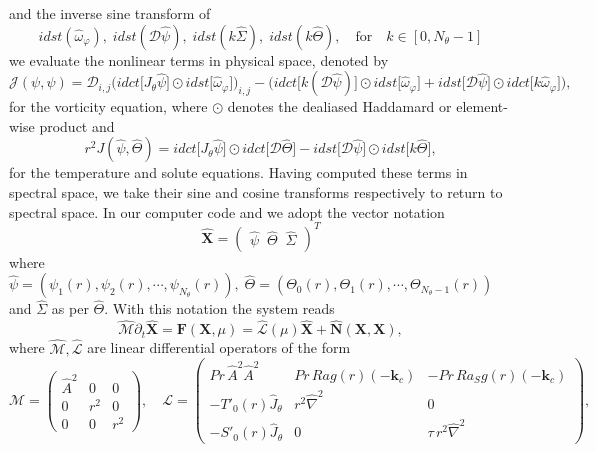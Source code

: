 \documentclass[a4paper]{article}
\begin{document}
\noindent and the inverse sine transform of
\begin{equation}
idst(\hat{\omega}_{\varphi}), \; idst(\mathcal{D} \hat{\psi}), \; idst(k \hat{\Sigma}), \; idst(k \hat{\Theta}), \quad \text{for} \quad k \in [0,N_{\theta}-1]
\end{equation}
 we evaluate the nonlinear terms in physical space, denoted by 
\begin{equation}
\mathcal{J}(\psi,\psi)  = \mathcal{D}_{i,j} \bigg( idct \big[   J_{\theta} \hat{\psi} \big] \odot idst\big[ \hat{\omega}_{\varphi} \big] \bigg)_{i,j}  - \bigg( idct\big[ k (\mathcal{D} \hat{\psi} ) \big] \odot idst\big[  \hat{\omega}_{\varphi} \big]  + idst\big[ \mathcal{D} \hat{\psi} \big] \odot idct\big[ k \hat{\omega}_{\varphi} \big] \bigg),
\label{eq:VORT_NL_SPEC}
\end{equation} 		
for the vorticity equation, where $\odot$ denotes the dealiased Haddamard or element-wise product and
\begin{equation}
r^2 J(\hat{\psi},\hat{\Theta})  = idct\big[ J_{\theta} \hat{\psi} \big] \odot idct\big[ \mathcal{D} \hat{\Theta} \big] - idst\big[ \mathcal{D} \hat{\psi} \big] \odot idst\big[ k \hat{\Theta} \big],
\label{eq:TEMP_NL_SPEC}
\end{equation}
\noindent for the temperature and solute equations. Having computed these terms in spectral space, we take their sine and cosine transforms respectively to return to spectral space. In our computer code and we adopt the vector notation
\begin{equation} 
\boldsymbol{\hat{X}} = \begin{pmatrix} \hat{\psi} \; \; \hat{\Theta} \; \; \hat{\Sigma} \end{pmatrix}^T 
\end{equation}
where $\hat{\psi} = \left( \psi_1(r), \psi_2(r), \cdots, \psi_{N_{\theta}}(r) \right), \; \hat{\Theta} = \left( \Theta_0(r), \Theta_1(r), \cdots, \Theta_{N_{\theta}-1}(r) \right)$ and $\hat{\Sigma}$ as per $\hat{\Theta}$. With this notation the system reads
\begin{equation}
\hat{\mathcal{M}} \partial_t \boldsymbol{\hat{X}} = \mathcal{\boldsymbol{F}}(\boldsymbol{X},\mu) = \hat{\mathcal{L}}(\mu)\boldsymbol{\hat{X}} + \hat{\boldsymbol{N}} ( \boldsymbol{X}, \boldsymbol{X} ),
\label{Full_Eqs_Matrix_SPEC}
\end{equation}
where $\hat{\mathcal{M}}, \hat{\mathcal{L}}$ are linear differential operators of the form
\begin{equation}
\mathcal{M} = \begin{pmatrix} \hat{A}^2 & 0 & 0 \\ 0 & r^2 & 0 \\ 0 & 0 & r^2 \end{pmatrix}, \quad
\mathcal{L} = \begin{pmatrix} 
Pr \, \hat{A}^2 \hat{A}^2 & Pr \, Ra g(r) (-\boldsymbol{k}_c) & -Pr \, Ra_S g(r) (-\boldsymbol{k}_c) \\  -T'_0(r) \hat{J}_{\theta} &  r^2 \hat{\nabla}^2 & 0 \\ -S'_0(r) \hat{J}_{\theta} & 0 & \tau \, r^2 \hat{\nabla}^2 
\end{pmatrix},
\end{equation}
\end{document}
